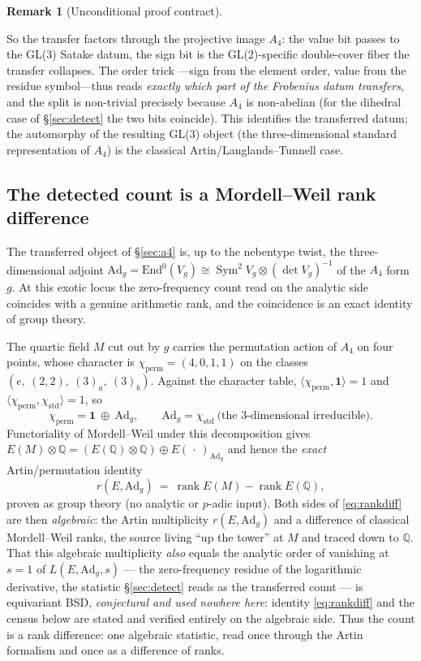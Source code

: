 \documentclass[11pt]{article}
\theoremstyle{definition}
\newtheorem{remark}[theorem]{Remark}
\newcommand{\Sym}{\operatorname{Sym}}
\begin{document}
\begin{remark}[Unconditional proof contract]
\begin{enumerate}
So the transfer factors through the projective image $A_4$: the value bit passes to the GL(3) Satake
datum, the sign bit is the GL(2)-specific double-cover fiber the transfer collapses. The order trick
---sign from the element order, value from the residue symbol---thus reads \emph{exactly which part
of the Frobenius datum transfers}, and the split is non-trivial precisely because $A_4$ is
non-abelian (for the dihedral case of \S\ref{sec:detect} the two bits coincide). This identifies the
transferred datum; the automorphy of the resulting GL(3) object (the three-dimensional standard
representation of $A_4$) is the classical Artin/Langlands--Tunnell case.

\subsection{The detected count is a Mordell--Weil rank difference}\label{sec:rankdiff}

The transferred object of \S\ref{sec:a4} is, up to the nebentype twist, the three-dimensional
adjoint $\mathrm{Ad}_g=\mathrm{End}^0(V_g)\cong\Sym^2 V_g\otimes(\det V_g)^{-1}$ of the $A_4$ form
$g$. At this exotic locus the zero-frequency count read on the analytic side coincides with a
genuine arithmetic rank, and the coincidence is an exact identity of group theory.

The quartic field $M$ cut out by $g$ carries the permutation action of $A_4$ on four points, whose
character is $\chi_{\mathrm{perm}}=(4,0,1,1)$ on the classes $(e,\ (2,2),\ (3)_a,\ (3)_b)$. Against the
character table, $\langle\chi_{\mathrm{perm}},\mathbf 1\rangle=1$ and
$\langle\chi_{\mathrm{perm}},\chi_{\mathrm{std}}\rangle=1$, so
\[
  \chi_{\mathrm{perm}}=\mathbf 1\ \oplus\ \mathrm{Ad}_g,\qquad \mathrm{Ad}_g=\chi_{\mathrm{std}}\
  \text{(the $3$-dimensional irreducible)} .
\]
Functoriality of Mordell--Weil under this decomposition gives
$E(M)\otimes\mathbb Q = (E(\mathbb Q)\otimes\mathbb Q)\oplus E(\,\cdot\,)_{\mathrm{Ad}_g}$ and hence the
\emph{exact} Artin/permutation identity
\begin{equation}\label{eq:rankdiff}
  r(E,\mathrm{Ad}_g)\ =\ \operatorname{rank}E(M)-\operatorname{rank}E(\mathbb Q),
\end{equation}
proven as group theory (no analytic or $p$-adic input). Both sides of \eqref{eq:rankdiff} are then
\emph{algebraic}: the Artin multiplicity $r(E,\mathrm{Ad}_g)$ and a difference of classical Mordell--Weil ranks,
the source living ``up the tower'' at $M$ and traced down to $\mathbb Q$. That this algebraic multiplicity
\emph{also} equals the analytic order of vanishing at $s=1$ of $L(E,\mathrm{Ad}_g,s)$ --- the zero-frequency
residue of the logarithmic derivative, the statistic \S\ref{sec:detect} reads as the transferred count --- is
equivariant BSD, \emph{conjectural and used nowhere here}: identity \eqref{eq:rankdiff} and the census below are
stated and verified entirely on the algebraic side. Thus the count is a rank difference: one algebraic statistic,
read once through the Artin formalism and once as a difference of ranks.


\end{enumerate}
\end{remark}
\end{document}
